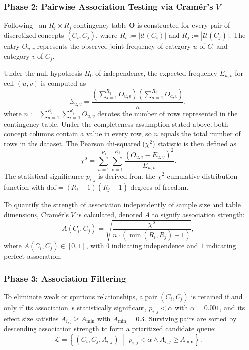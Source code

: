 \subsubsection{Phase 2: Pairwise Association Testing via Cramér's $V$}

Following \cite{ben-shacharPhiFeiFo2023}, an $R_i \times R_j$ contingency table $\mathbf{O}$ is constructed for every pair of discretized concepts $(C_i, C_j)$, where $R_i := |\mathcal{U}(C_i)|$ and $R_j := |\mathcal{U}(C_j)|$. The entry $O_{u,v}$ represents the observed joint frequency of category $u$ of $C_i$ and category $v$ of $C_j$.

Under the null hypothesis $H_0$ of independence, the expected frequency $E_{u,v}$ for cell $(u,v)$ is computed as
\begin{equation}
	E_{u,v} = \frac{\left( \sum_{b=1}^{R_j} O_{u,b} \right) \left( \sum_{a=1}^{R_i} O_{a,v} \right)}{n},
\end{equation}
where $n:=\sum_{u=1}^{R_i}\sum_{v=1}^{R_j}O_{u,v}$ denotes the number of rows represented in the contingency table. Under the completeness assumption stated above, both concept columns contain a value in every row, so $n$ equals the total number of rows in the dataset. The Pearson chi-squared ($\chi^2$) statistic is then defined as
\begin{equation}
	\chi^2 = \sum_{u=1}^{R_i} \sum_{v=1}^{R_j} \frac{(O_{u,v} - E_{u,v})^2}{E_{u,v}}.
\end{equation}
The statistical significance $p_{i,j}$ is derived from the $\chi^2$ cumulative distribution function with $\text{dof} = (R_i - 1)(R_j - 1)$ degrees of freedom.

To quantify the strength of association independently of sample size and table dimensions, Cramér's $V$ is calculated, denoted $A$ to signify association strength:
\begin{equation}
	A(C_i, C_j) = \sqrt{\frac{\chi^2}{n \cdot (\min(R_i, R_j) - 1)}},
\end{equation}
where $A(C_i, C_j) \in [0, 1]$, with $0$ indicating independence and $1$ indicating perfect association.

\subsubsection{Phase 3: Association Filtering}

To eliminate weak or spurious relationships, a pair $(C_i, C_j)$ is retained if and only if its association is statistically significant, $p_{i,j} < \alpha$ with $\alpha = 0.001$, and its effect size satisfies $A_{i,j} \ge A_{\min}$ with $A_{\min} = 0.3$.
Surviving pairs are sorted by descending association strength to form a prioritized candidate queue:
\begin{equation}
	\mathcal{L} = \left\{ (C_i, C_j, A_{i,j}) \;\middle|\; p_{i,j} < \alpha \land A_{i,j} \ge A_{\min} \right\}.
\end{equation}

